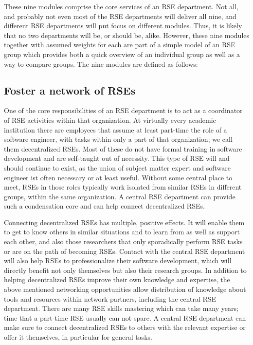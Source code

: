 \documentclass{article}
\begin{document}
These nine modules comprise the core services of an RSE department.
Not all, and probably not even most of the RSE departments will deliver all nine, and different RSE departments will put focus on different modules.
Thus, it is likely that no two departments will be, or should be, alike.
However, these nine modules together with assumed weights for each are part of a simple model of an RSE group which provides both a quick overview of an individual group as well as a way to compare groups.
The nine modules are defined as follows:

\subsection{Foster a network of RSEs}

One of the core responsibilities of an RSE department is to act as a coordinator of RSE activities within that organization.
At virtually every academic institution there are employees that assume at least part-time the role of a software engineer, with tasks within only a part of that organization; we call them decentralized RSEs.
Most of these do not have formal training in software development and are self-taught out of necessity.
This type of RSE will and should continue to exist, as the union of subject matter expert and software engineer ist often necessary or at least useful.
Without some central place to meet, RSEs in those roles typically work isolated from similar RSEs in different groups, within the same organization.
A central RSE department can provide such a condensation core and can help connect decentralized RSEs.

Connecting decentralized RSEs has multiple, positive effects.
It will enable them to get to know others in similar situations and to learn from as well as support each other, and also those researchers that only sporadically perform RSE tasks or are on the path of becoming RSEs.
Contact with the central RSE department will also help RSEs to professionalize their software development, which will directly benefit not only themselves but also their research groups.
In addition to helping decentralized RSEs improve their own knowledge and expertise, the above mentioned networking opportunities allow distribution of knowledge about tools and resources within network partners, including the central RSE department.
There are many RSE skills mastering which can take many years; time that a part-time RSE usually can not spare.
A central RSE department can make sure to connect decentralized RSEs to others with the relevant expertise or offer it themselves, in particular for general tasks.
\end{document}
